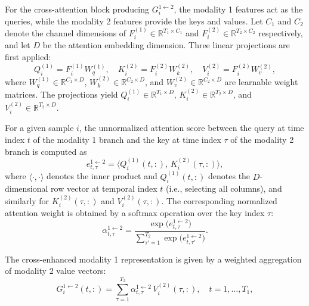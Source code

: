\documentclass[a4paper]{cas-sc}
\begin{document}
For the cross-attention block producing $G_i^{1 \leftarrow 2}$, the modality 1 features act as the queries, while the modality 2 features provide the keys and values. Let $C_1$ and $C_2$ denote the channel dimensions of $F_i^{(1)} \in \mathbb{R}^{T_1 \times C_1}$ and $F_i^{(2)} \in \mathbb{R}^{T_2 \times C_2}$ respectively, and let $D$ be the attention embedding dimension.
Three linear projections are first applied:
\begin{equation}
Q_i^{(1)} = F_i^{(1)} W_q^{(1)}, \quad
K_i^{(2)} = F_i^{(2)} W_k^{(2)}, \quad
V_i^{(2)} = F_i^{(2)} W_v^{(2)},
\label{eq:caim_qkv_v2a}
\end{equation}
where $W_q^{(1)} \in \mathbb{R}^{C_1 \times D}$, $W_k^{(2)} \in \mathbb{R}^{C_2 \times D}$, and
$W_v^{(2)} \in \mathbb{R}^{C_2 \times D}$ are learnable weight matrices. The projections yield $Q_i^{(1)}\in\mathbb{R}^{T_1\times D}$, $K_i^{(2)}\in\mathbb{R}^{T_2 \times D}$, and $V_i^{(2)}\in\mathbb{R}^{T_2 \times D}$.  

For a given sample $i$, the unnormalized attention score between the query at time index $t$ of the modality 1 branch and the key at time index $\tau$ of the modality 2 branch is computed as
\begin{equation}
    e_{t,\tau}^{1 \leftarrow 2}
    =
    \big\langle Q_i^{(1)}(t,:),\, K_i^{(2)}(\tau,:) \big\rangle,
    \label{eq:caim_score_v2a}
\end{equation}
where $\langle \cdot, \cdot \rangle$ denotes the inner product and $Q_i^{(1)}(t,:)$ denotes the
$D$-dimensional row vector at temporal index $t$ (i.e., selecting all columns), and similarly for
$K_i^{(2)}(\tau,:)$ and $V_i^{(2)}(\tau,:)$. The corresponding normalized attention weight is obtained by a softmax operation over the key index $\tau$:
\begin{equation}
    \alpha_{t,\tau}^{1 \leftarrow 2}
    =
    \frac{\exp\big( e_{t,\tau}^{1 \leftarrow 2} \big)}
    {\displaystyle \sum_{\tau' = 1}^{T_2} \exp\big( e_{t,\tau'}^{1 \leftarrow 2} \big)}.
    \label{eq:caim_att_weight_v2a}
\end{equation}

The cross-enhanced modality 1 representation is given by a weighted aggregation of modality 2 value vectors:
\begin{equation}
    G_i^{1 \leftarrow 2}(t,:)
    =
    \sum_{\tau=1}^{T_2}
    \alpha_{t,\tau}^{1 \leftarrow 2} \, V_i^{(2)}(\tau,:),
    \quad t = 1,\dots,T_1,
    \label{eq:caim_output_v2a}
\end{equation}
\end{document}
